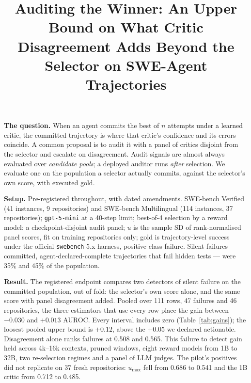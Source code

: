 \documentclass[11pt,a4paper]{article}
\title[Auditing the Winner]{Auditing the Winner: An Upper Bound on What Critic Disagreement Adds Beyond the Selector on SWE-Agent Trajectories}
\begin{document}
\maketitle

\textbf{The question.} When an agent commits the best of $n$ attempts under a learned critic, the committed trajectory is where that critic's confidence and its errors coincide. A common proposal is to audit it with a panel of critics disjoint from the selector and escalate on disagreement. Audit signals are almost always evaluated over \emph{candidate pools}; a deployed auditor runs \emph{after} selection. We evaluate one on the population a selector actually commits, against the selector's own score, with executed gold.

\textbf{Setup.} Pre-registered throughout, with dated amendments. SWE-bench Verified (41 instances, 9 repositories) and SWE-bench Multilingual (114 instances, 37 repositories); \texttt{gpt-5-mini} at a 40-step limit; best-of-4 selection by a reward model; a checkpoint-disjoint audit panel; $u$ is the sample SD of rank-normalised panel scores, fit on training repositories only; gold is trajectory-level success under the official \texttt{swebench} 5.x harness, positive class failure. Silent failures --- committed, agent-declared-complete trajectories that fail hidden tests --- were 35\% and 45\% of the population.

\textbf{Result.} The registered endpoint compares two detectors of silent failure on the committed population, out of fold: the selector's own score alone, and the same score with panel disagreement added. Pooled over 111 rows, 47 failures and 46 repositories, the three estimators that use every row place the gain between $-0.030$ and $+0.013$ AUROC. Every interval includes zero (Table~\ref{tab:gains}); the loosest pooled upper bound is $+0.12$, above the $+0.05$ we declared actionable. Disagreement alone ranks failures at 0.508 and 0.565. This failure to detect gain held across 4k--16k contexts, pruned windows, eight reward models from 1B to 32B, two re-selection regimes and a panel of LLM judges. The pilot's positives did not replicate on 37 fresh repositories: $u_{\max}$ fell from 0.686 to 0.541 and the 1B critic from 0.712 to 0.485.
\end{document}
